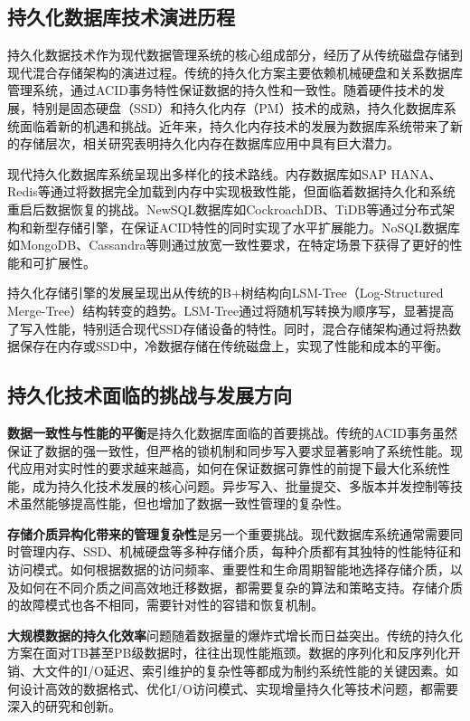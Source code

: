 \subsection{持久化数据库技术演进历程}

持久化数据技术作为现代数据管理系统的核心组成部分，经历了从传统磁盘存储到现代混合存储架构的演进过程。传统的持久化方案主要依赖机械硬盘和关系数据库管理系统，通过ACID事务特性保证数据的持久性和一致性。随着硬件技术的发展，特别是固态硬盘（SSD）和持久化内存（PM）技术的成熟，持久化数据库系统面临着新的机遇和挑战\cite{c115}。近年来，持久化内存技术的发展为数据库系统带来了新的存储层次，相关研究表明持久化内存在数据库应用中具有巨大潜力\cite{c116}。

现代持久化数据库系统呈现出多样化的技术路线。内存数据库如SAP HANA、Redis等通过将数据完全加载到内存中实现极致性能，但面临着数据持久化和系统重启后数据恢复的挑战\cite{c117}。NewSQL数据库如CockroachDB、TiDB等通过分布式架构和新型存储引擎，在保证ACID特性的同时实现了水平扩展能力\cite{c118}。NoSQL数据库如MongoDB、Cassandra等则通过放宽一致性要求，在特定场景下获得了更好的性能和可扩展性。

持久化存储引擎的发展呈现出从传统的B+树结构向LSM-Tree（Log-Structured Merge-Tree）结构转变的趋势。LSM-Tree通过将随机写转换为顺序写，显著提高了写入性能，特别适合现代SSD存储设备的特性\cite{c120}。同时，混合存储架构通过将热数据保存在内存或SSD中，冷数据存储在传统磁盘上，实现了性能和成本的平衡\cite{c121}。

\subsection{持久化技术面临的挑战与发展方向}

\textbf{数据一致性与性能的平衡}是持久化数据库面临的首要挑战。传统的ACID事务虽然保证了数据的强一致性，但严格的锁机制和同步写入要求显著影响了系统性能\cite{c122}。现代应用对实时性的要求越来越高，如何在保证数据可靠性的前提下最大化系统性能，成为持久化技术发展的核心问题。异步写入、批量提交、多版本并发控制等技术虽然能够提高性能，但也增加了数据一致性管理的复杂性\cite{c123}。

\textbf{存储介质异构化带来的管理复杂性}是另一个重要挑战。现代数据库系统通常需要同时管理内存、SSD、机械硬盘等多种存储介质，每种介质都有其独特的性能特征和访问模式。如何根据数据的访问频率、重要性和生命周期智能地选择存储介质，以及如何在不同介质之间高效地迁移数据，都需要复杂的算法和策略支持。存储介质的故障模式也各不相同，需要针对性的容错和恢复机制\cite{c125}。

\textbf{大规模数据的持久化效率}问题随着数据量的爆炸式增长而日益突出。传统的持久化方案在面对TB甚至PB级数据时，往往出现性能瓶颈\cite{c126}。数据的序列化和反序列化开销、大文件的I/O延迟、索引维护的复杂性等都成为制约系统性能的关键因素。如何设计高效的数据格式、优化I/O访问模式、实现增量持久化等技术问题，都需要深入的研究和创新\cite{c127}。

